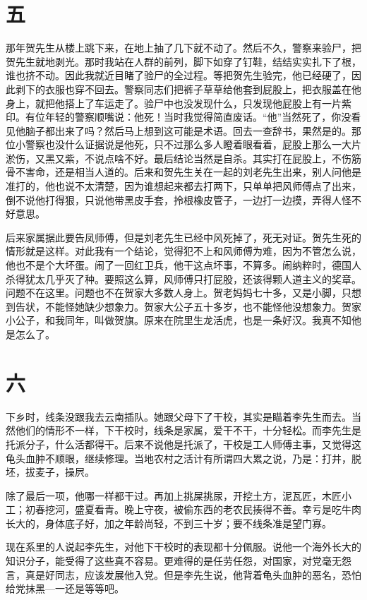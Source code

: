 \section{五}

那年贺先生从楼上跳下来，在地上抽了几下就不动了。然后不久，警察来验尸，把贺先生就地剥光。那时我站在人群的前列，脚下如穿了钉鞋，结结实实扎下了根，谁也挤不动。因此我就近目睹了验尸的全过程。等把贺先生验完，他已经硬了，因此剥下的衣服也穿不回去。警察同志们把裤子草草给他套到屁股上，把衣服盖在他身上，就把他搭上了车运走了。验尸中也没发现什么，只发现他屁股上有一片紫印。有位年轻的警察顺嘴说：他死！当时我觉得简直废话。“他”当然死了，你没看见他脑子都出来了吗？然后马上想到这可能是术语。回去一查辞书，果然是的。那位小警察也没什么证据说是他死，只不过那么多人瞪着眼看着，屁股上那么一大片淤伤，又黑又紫，不说点啥不好。最后结论当然是自杀。其实打在屁股上，不伤筋骨不害命，还是相当人道的。后来和贺先生关在一起的刘老先生出来，别人问他是准打的，他也说不太清楚，因为谁想起来都去打两下，只单单把风师傅点了出来，倒不说他打得狠，只说他带黑皮手套，拎根橡皮管子，一边打一边摸，弄得人怪不好意思。 

后来家属据此要告凤师傅，但是刘老先生已经中风死掉了，死无对证。贺先生死的情形就是这样。对此我有一个结论，觉得犯不上和风师傅为难，因为不管怎么说，他也不是个大坏蛋。闹了一回红卫兵，他干这点坏事，不算多。闹纳粹时，德国人杀得犹太几乎灭了种。要照这么算，风师傅只打屁股，还该得颗人道主义的奖章。问题不在这里。问题也不在贺家大多数人身上。贺老妈妈七十多，又是小脚，只想到告状，不能怪她缺少想象力。贺家大公子五十多岁，也不能怪他没想象力。贺家小公子，和我同年，叫做贺旗。原来在院里生龙活虎，也是一条好汉。我真不知他是怎么了。

\section{六}

下乡时，线条没跟我去云南插队。她跟父母下了干校，其实是瞄着李先生而去。当然他们的情形不一样，下干校时，线条是家属，爱干不干，十分轻松。而李先生是托派分子，什么活都得干。后来不说他是托派了，干校是工人师傅主事，又觉得这龟头血肿不顺眼，继续修理。当地农村之活计有所谓四大累之说，乃是：打井，脱坯，拔麦子，操屄。 

除了最后一项，他哪一样都干过。再加上挑屎挑尿，开挖土方，泥瓦匠，木匠小工；初春挖河，盛夏看青。晚上守夜，被偷东西的老农民揍得不善。幸亏是吃牛肉长大的，身体底子好，加之年龄尚轻，不到三十岁；要不线条准是望门寡。 

现在系里的人说起李先生，对他下干校时的表现都十分佩服。说他一个海外长大的知识分子，能受得了这些真不容易。更难得的是任劳任怨，对国家，对党毫无怨言，真是好同志，应该发展他入党。但是李先生说，他背着龟头血肿的恶名，恐怕给党抹黑—一还是等等吧。 

